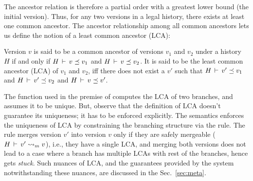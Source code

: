 The ancestor relation is therefore a partial order with a greatest
lower bound (the initial version).  Thus, for any two versions in a
legal history, there exists at least one common ancestor.  The ancestor
relationship among all common ancestors lets us define the notion of a
least common ancestor (LCA):

\begin{definition} 
Version $v$ is said to be a common ancestor of versions $v_1$ and
$v_2$ under a history $H$ if and only if $H\,\vdash\,v \preceq v_1$
and $H\,\vdash\,v \preceq v_2$. It is said to be the least common
ancestor (LCA) of $v_1$ and $v_2$, iff there does not exist a $v'$
such that $H\,\vdash\,v' \preceq v_1$ and $H\,\vdash\,v' \preceq v_2$
and $H\,\vdash\,v \preceq v'$.
\end{definition}

The function  used in the premise of 
computes the LCA of two branches, and assumes it to be unique.  But,
observe that the definition of LCA doesn't guarantee its uniqueness;
it has to be enforced explicitly.  The semantics enforces the
uniqueness of LCA by constraining the branching structure via the
 rule. The rule merges version $v'$ into
version $v$ only if they are safely mergeable ($H\,\vdash\,v' \rightsquigarrow_m
v$), i.e., they have a single LCA, and merging both versions does not
lead to a case where a branch has multiple LCAs with rest of the
branches, hence gets \emph{stuck}. Such nuances of LCA, and the
guarantees provided by the system notwithstanding these nuances, are
discussed in the Sec.~\ref{sec:meta}. 




